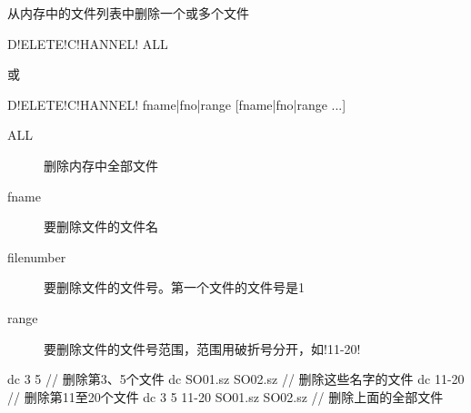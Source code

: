 \label{cmd:deletechannel}

从内存中的文件列表中删除一个或多个文件

\begin{SACSTX}
D!ELETE!C!HANNEL! ALL
\end{SACSTX}
或
\begin{SACSTX}
D!ELETE!C!HANNEL! fname|fno|range [fname|fno|range ...]
\end{SACSTX}

\begin{description}
\item [ALL] 删除内存中全部文件
\item [fname] 要删除文件的文件名
\item [filenumber] 要删除文件的文件号。第一个文件的文件号是1
\item [range] 要删除文件的文件号范围，范围用破折号分开，如!11-20!
\end{description}

\begin{SACCode}
  dc 3 5                         // 删除第3、5个文件
  dc SO01.sz SO02.sz             // 删除这些名字的文件
  dc 11-20                       // 删除第11至20个文件
  dc 3 5 11-20 SO01.sz SO02.sz   // 删除上面的全部文件
\end{SACCode}
